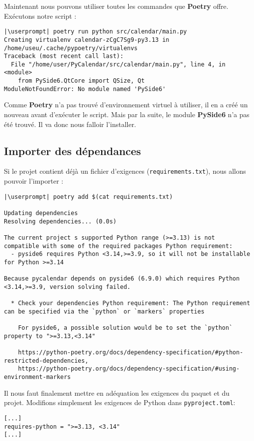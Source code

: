 Maintenant nous pouvons utiliser toutes les commandes que \textbf{Poetry} offre. Exécutons notre script :
\begin{lstlisting}[style=bash]
|\userprompt| poetry run python src/calendar/main.py
Creating virtualenv calendar-zCgC7Sg9-py3.13 in /home/useu/.cache/pypoetry/virtualenvs
Traceback (most recent call last):
  File "/home/user/PyCalendar/src/calendar/main.py", line 4, in <module>
    from PySide6.QtCore import QSize, Qt
ModuleNotFoundError: No module named 'PySide6'
\end{lstlisting}

Comme \textbf{Poetry} n’a pas trouvé d’environnement virtuel à utiliser, il en a créé un nouveau avant d’exécuter le script. Mais par la suite, le module \textbf{PySide6} n'a pas été trouvé. Il va donc nous falloir l'installer.

\subsection*{Importer des dépendances}
Si le projet contient déjà un fichier d'exigences (\texttt{requirements.txt}), nous allons pouvoir l'importer :
\begin{lstlisting}[style=bash]
|\userprompt| poetry add $(cat requirements.txt)

Updating dependencies
Resolving dependencies... (0.0s)

The current project s supported Python range (>=3.13) is not compatible with some of the required packages Python requirement:
  - pyside6 requires Python <3.14,>=3.9, so it will not be installable for Python >=3.14

Because pycalendar depends on pyside6 (6.9.0) which requires Python <3.14,>=3.9, version solving failed.

  * Check your dependencies Python requirement: The Python requirement can be specified via the `python` or `markers` properties

    For pyside6, a possible solution would be to set the `python` property to ">=3.13,<3.14"

    https://python-poetry.org/docs/dependency-specification/#python-restricted-dependencies,
    https://python-poetry.org/docs/dependency-specification/#using-environment-markers
\end{lstlisting}

Il nous faut finalement mettre en adéquation les exigences du paquet et du projet. Modifions simplement les exigences de Python dans \texttt{pyproject.toml}:
\begin{lstlisting}[style=file]
[...]
requires-python = ">=3.13, <3.14"
[...]
\end{lstlisting}

